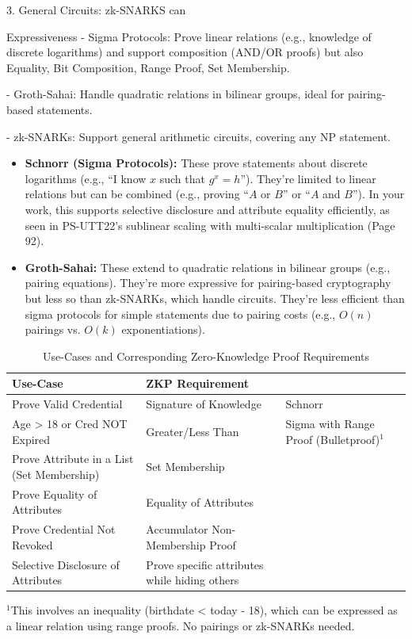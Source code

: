 3. General Circuits: zk-SNARKS can 

Expressiveness
- Sigma Protocols: Prove linear relations (e.g., knowledge of discrete logarithms) and support composition (AND/OR proofs) but also Equality, Bit Composition, Range Proof, Set Membership.

- Groth-Sahai: Handle quadratic relations in bilinear groups, ideal for pairing-based statements.

- zk-SNARKs: Support general arithmetic circuits, covering any NP statement.

\begin{itemize}
\item \textbf{Schnorr (Sigma Protocols):} These prove statements about discrete logarithms (e.g., ``I know $x$ such that $g^x = h$''). They're limited to linear relations but can be combined (e.g., proving ``$A$ or $B$'' or ``$A$ and $B$''). In your work, this supports selective disclosure and attribute equality efficiently, as seen in PS-UTT22's sublinear scaling with multi-scalar multiplication (Page 92).

\item \textbf{Groth-Sahai:} These extend to quadratic relations in bilinear groups (e.g., pairing equations). They're more expressive for pairing-based cryptography but less so than zk-SNARKs, which handle circuits. They're less efficient than sigma protocols for simple statements due to pairing costs (e.g., $O(n)$ pairings vs. $O(k)$ exponentiations).
\end{itemize}


\begin{table}[h]
    \centering
    \begin{tabular}{|l|l||l}
        \hline
        \textbf{Use-Case} & \textbf{ZKP Requirement} \\
        \hline
        Prove Valid Credential 
        & 
        Signature of Knowledge 
        &
        Schnorr
        \\
        \hline
        Age > 18 or Cred NOT Expired 
        & 
        Greater/Less Than 
        &
        Sigma with Range Proof (Bulletproof)$^1$
        \\
        \hline
        Prove Attribute in a List (Set Membership) 
        & 
        Set Membership\\
        \hline
        Prove Equality of Attributes 
        & 
        Equality of Attributes \\
        \hline
        Prove Credential Not Revoked 
        & 
        Accumulator Non-Membership Proof \\
        \hline
        Selective Disclosure of Attributes 
        & 
        Prove specific attributes while hiding others \\
        \hline
    \end{tabular}
    \caption{Use-Cases and Corresponding Zero-Knowledge Proof Requirements}
    \label{tab:use_cases_zkp}
    \footnotesize{$^1$This involves an inequality (birthdate < today - 18), which can be expressed as a linear relation using range proofs. No pairings or zk-SNARKs needed.}
\end{table}


